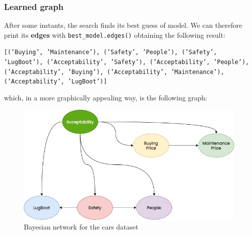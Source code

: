 \subsubsection{Learned graph}
After some instants, the search finds its best guess of model. We can therefore print its \textbf{edges} with \texttt{best\_model.edges()} obtaining the following result:
\begin{center}
\texttt{[('Buying', 'Maintenance'), ('Safety', 'People'), ('Safety', 'LugBoot'), ('Acceptability', 'Safety'), ('Acceptability', 'People'), ('Acceptability', 'Buying'), ('Acceptability', 'Maintenance'), ('Acceptability', 'LugBoot')]}
\end{center}
which, in a more graphically appealing way, is the following graph:
\begin{figure}[ht]
    \centering\includegraphics[width=0.8\linewidth]{figures/DAG.png}
    \caption{Bayesian network for the cars dataset}
    \label{fig:errors}
\end{figure}

